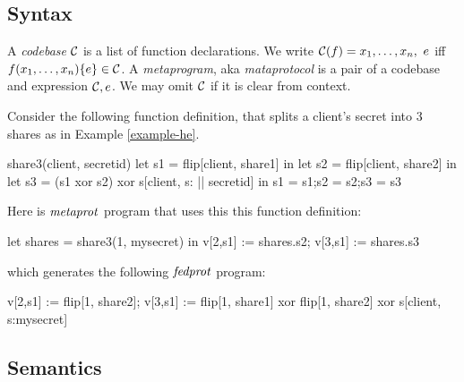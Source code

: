 \subsection{Syntax}

\begin{definition}
A \emph{codebase} $\mathcal{C}$ is a list of function 
declarations. We write $ \mathcal{C}(f) = x_1,\ldots,x_n,\ e$
iff $f(x_1,\ldots,x_n) \{ e \} \in \mathcal{C}$.
A \emph{metaprogram}, aka \emph{mataprotocol} is a pair of a 
codebase and expression $\mathcal{C}, e$. We may omit
$\mathcal{C}$ if it is clear from context.  
\end{definition}

\begin{example} Consider the following function definition,
  that splits a client's secret into 3 shares as in
  Example \ref{example-he}. 
  \begin{verbatimtab}
    share3(client, secretid)
    {
      let s1 = flip[client, share1] in
      let s2 = flip[client, share2] in
      let s3 = (s1 xor s2) xor s[client, s: || secretid] in
      {s1 = s1;s2 = s2;s3 = s3}
    } \end{verbatimtab}
  Here is $\mathit{metaprot}$ program that uses this this function definition:
  \begin{verbatimtab}
    let shares = share3(1, mysecret) in
    v[2,s1] := shares.s2;
    v[3,s1] := shares.s3 \end{verbatimtab}
  which generates the following $\mathit{fedprot}$ program:
  \begin{verbatimtab}
    v[2,s1] := flip[1, share2];
    v[3,s1] := flip[1, share1] xor flip[1, share2] xor s[client, s:mysecret] \end{verbatimtab}
\end{example}

\subsection{Semantics}

